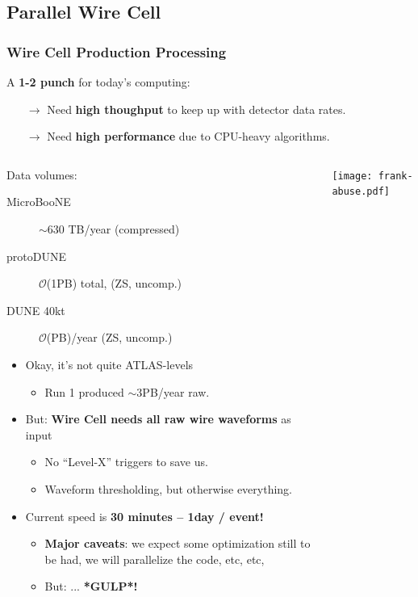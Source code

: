 \documentclass[xcolor=dvipsnames]{beamer}
\begin{document}

\subsection{Parallel Wire Cell}

\begin{frame}
  \frametitle{Wire Cell Production Processing}

  A \textbf{1-2 punch} for today's computing:
  \begin{itemize}\footnotesize
  \item[$\rightarrow$] Need \textbf{high thoughput} to keep up with detector data rates.
  \item[$\rightarrow$] Need \textbf{high performance} due to CPU-heavy algorithms.
  \end{itemize}

  \footnotesize

  \begin{columns}
    \begin{column}{0.70\textwidth}
      \scriptsize
      Data volumes:
      \begin{description}
      \item[MicroBooNE] $\sim$630 TB/year (compressed)
      \item[protoDUNE] $\mathcal{O}$(1PB) total, (ZS, uncomp.)
      \item[DUNE 40kt] $\mathcal{O}$(PB)/year (ZS, uncomp.)
      \end{description}
      \begin{itemize}
      \item Okay, it's not quite ATLAS-levels 
        \begin{itemize}\scriptsize
        \item Run 1 produced $\sim$3PB/year raw.
        \end{itemize}
      \item But: \textbf{Wire Cell needs all raw wire waveforms} as input
        \begin{itemize}\scriptsize
        \item No ``Level-X'' triggers to save us.
        \item Waveform thresholding, but otherwise everything.
        \end{itemize}
      \item Current speed is \textbf{30 minutes -- 1day / event!}
        \begin{itemize}\scriptsize
        \item \textbf{Major caveats}: we expect some optimization
          still to be had, we will parallelize the code, etc, etc,
        \item But: ... \textbf{*GULP*!}
        \end{itemize}
      \end{itemize}
    \end{column}
    \begin{column}{0.30\textwidth}
      \begin{center}
        \texttt{[image: frank-abuse.pdf]}


\end{center}
\end{column}
\end{columns}
\end{frame}
\end{document}
